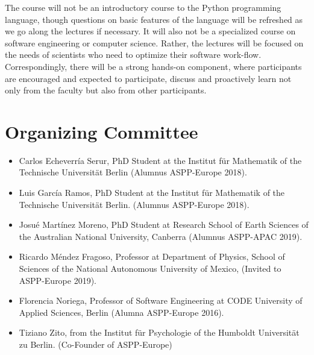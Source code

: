 \documentclass{article}[11pt]
\begin{document}
The course will not be an introductory course to the Python programming 
language, though questions on basic features of the language will be refreshed 
as we go along the lectures if necessary. It will also not be a specialized 
course on software engineering or computer science. Rather, the lectures will 
be focused on the needs of scientists who need to optimize their software 
work-flow. Correspondingly, there will be a strong hands-on component, where 
participants are encouraged and expected to participate, discuss and proactively 
learn not only from the faculty but also from other participants. 


\section*{Organizing Committee}
\begin{itemize}
    \item Carlos Echeverr\'ia Serur, PhD Student at the Institut f\"ur Mathematik of the Technische Universit\"at Berlin (Alumnus ASPP-Europe 2018).

    \item Luis Garc\'ia Ramos, PhD Student at the Institut f\"ur Mathematik of the Technische Universit\"at Berlin. (Alumnus ASPP-Europe 2018).
    
    \item Josu\'e Mart\'inez Moreno, PhD Student at Research School of Earth Sciences of the Australian National University, Canberra (Alumnus ASPP-APAC 2019).

    \item Ricardo M\'endez Fragoso, Professor at Department of Physics, School of Sciences of the National Autonomous University of Mexico, (Invited to ASPP-Europe 2019).
    
    \item Florencia Noriega, Professor of Software Engineering at CODE University of Applied Sciences, Berlin (Alumna ASPP-Europe 2016).
  
    \item Tiziano Zito, from the Institut f\"ur Psychologie of the Humboldt Universit\"at zu Berlin. (Co-Founder of ASPP-Europe)

\end{itemize}
\end{document}
